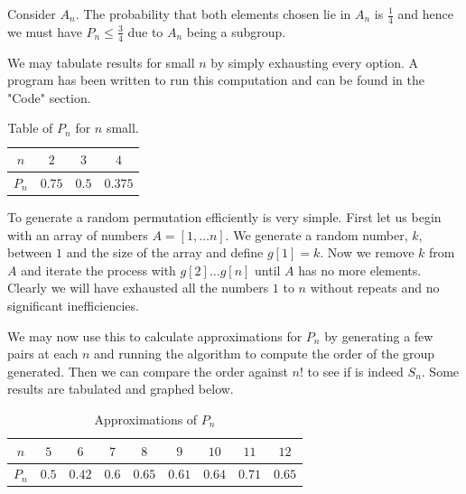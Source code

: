 \documentclass{article}
\begin{document}
\vspace*{5mm}

Consider $A_n$. The probability that both elements chosen lie in $A_n$ is $\frac{1}{4}$ and hence we must have $P_n \leq \frac{3}{4}$ due to $A_n$ being a subgroup.

\vspace*{5mm}

We may tabulate results for small $n$ by simply exhausting every option. A program has been written to run this computation and can be found in the "Code" section.


\begin{table}[h!]
	\centering
	\begin{tabular}{ |c|c|c|c| }
		\hline
		$n$   & $2$    & $3$   & $4$     \\ \hline
		$P_n$ & $0.75$ & $0.5$ & $0.375$ \\ \hline
	\end{tabular}
	\caption{Table of $P_n$ for $n$ small.}
\end{table}


To generate a random permutation efficiently is very simple. First let us begin with an array of numbers $A = [1, \dots n]$. We generate a random number, $k$, between $1$ and the size of the array and define $g[1] = k$.
Now we remove $k$ from $A$ and iterate the process with $g[2] \dots g[n]$ until $A$ has no more elements. Clearly we will have exhausted all the numbers $1$ to $n$ without repeats and no significant inefficiencies.

\vspace{5mm}

We may now use this to calculate approximations for $P_n$ by generating a few pairs at each $n$ and running the algorithm to compute the order of the group generated. Then we can compare the order against $n!$ to see if is indeed $S_n$. Some results are tabulated and graphed below.

\clearpage

\begin{table}[h!]
	\centering
	\begin{tabular}{ |c|cccccccc| }
		\hline
		$n$   & $5$   & $6$    & $7$   & $8$    & $9$    & $10$   & $11$   & $12$   \\ \hline
		$P_n$ & $0.5$ & $0.42$ & $0.6$ & $0.65$ & $0.61$ & $0.64$ & $0.71$ & $0.65$ \\ \hline
	\end{tabular}
	\caption{Approximations of $P_n$}
\end{table}
\end{document}
